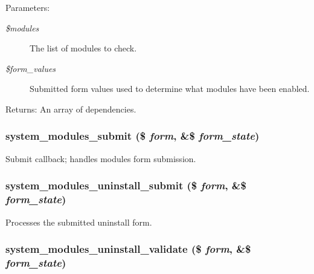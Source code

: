 \begin{Desc}
\item[Parameters:]
\begin{description}
\item[{\em \$modules}]The list of modules to check. \item[{\em \$form\_\-values}]Submitted form values used to determine what modules have been enabled. \end{description}
\end{Desc}
\begin{Desc}
\item[Returns:]An array of dependencies. \end{Desc}
\hypertarget{system_8admin_8inc_b5e3e0148d76ec1bfe7e441d4ff56146}{
\subsubsection[{system\_\-modules\_\-submit}]{\setlength{\rightskip}{0pt plus 5cm}system\_\-modules\_\-submit (\$ {\em form}, \/  \&\$ {\em form\_\-state})}}
\label{system_8admin_8inc_b5e3e0148d76ec1bfe7e441d4ff56146}


Submit callback; handles modules form submission. \hypertarget{system_8admin_8inc_a4fa94b5401ff21e77b711edf0e196c4}{
\subsubsection[{system\_\-modules\_\-uninstall\_\-submit}]{\setlength{\rightskip}{0pt plus 5cm}system\_\-modules\_\-uninstall\_\-submit (\$ {\em form}, \/  \&\$ {\em form\_\-state})}}
\label{system_8admin_8inc_a4fa94b5401ff21e77b711edf0e196c4}


Processes the submitted uninstall form. \hypertarget{system_8admin_8inc_043bb0ba8fa3b299202ffee8d63e9fca}{
\subsubsection[{system\_\-modules\_\-uninstall\_\-validate}]{\setlength{\rightskip}{0pt plus 5cm}system\_\-modules\_\-uninstall\_\-validate (\$ {\em form}, \/  \&\$ {\em form\_\-state})}}
\label{system_8admin_8inc_043bb0ba8fa3b299202ffee8d63e9fca}


